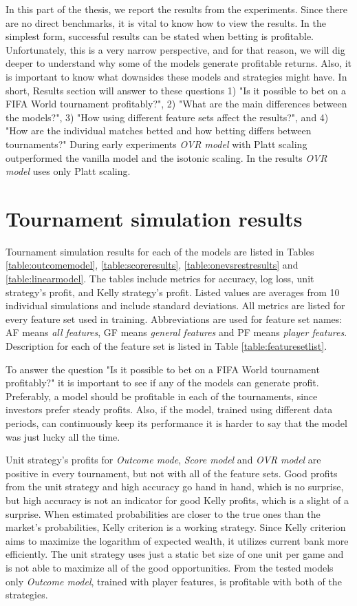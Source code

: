 In this part of the thesis, we report the results from the experiments. Since there are no direct benchmarks, it is vital to know how to view the results. In the simplest form, successful results can be stated when betting is profitable. Unfortunately, this is a very narrow perspective, and for that reason, we will dig deeper to understand why some of the models generate profitable returns. Also, it is important to know what downsides these models and strategies might have.  In short, Results section will answer to these questions 1) "Is it possible to bet on a FIFA World tournament profitably?",  2) "What are the main differences between the models?", 3) "How using different feature sets affect the results?", and 4) "How are the individual matches betted and how betting differs between tournaments?" During early experiments \textit{OVR model} with Platt scaling outperformed the vanilla model and the isotonic scaling. In the results \textit{OVR model} uses only Platt scaling.

\section{Tournament simulation results}
Tournament simulation results for each of the models are listed in Tables \ref{table:outcomemodel}, \ref{table:scoreresults}, \ref{table:onevsrestresults} and \ref{table:linearmodel}. The tables include metrics for accuracy, log loss, unit strategy's profit, and Kelly strategy's profit. Listed values are averages from 10 individual simulations and include standard deviations. All metrics are listed for every feature set used in training. Abbreviations are used for feature set names: AF means \textit{all features}, GF means \textit{general features} and PF means \textit{player features}. Description for each of the feature set is listed in Table \ref{table:featuresetlist}.

To answer the question "Is it possible to bet on a FIFA World tournament profitably?" it is important to see if any of the models can generate profit. Preferably, a model should be profitable in each of the tournaments, since investors prefer steady profits. Also, if the model, trained using different data periods, can continuously keep its performance it is harder to say that the model was just lucky all the time.

Unit strategy's profits for \textit{Outcome mode}, \textit{Score model} and \textit{OVR model} are positive in every tournament, but not with all of the feature sets. Good profits from the unit strategy and high accuracy go hand in hand, which is no surprise, but high accuracy is not an indicator for good Kelly profits, which is a slight of a surprise. When estimated probabilities are closer to the true ones than the market's probabilities, Kelly criterion is a working strategy. Since Kelly criterion aims to maximize the logarithm of expected wealth, it utilizes current bank more efficiently. The unit strategy uses just a static bet size of one unit per game and is not able to maximize all of the good opportunities. From the tested models only \textit{Outcome model}, trained with player features, is profitable with both of the strategies.

